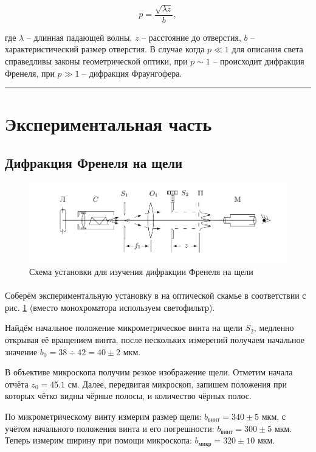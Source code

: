 \documentclass[a4paper,12pt]{article} %
\begin{document}
\[
p = \frac{\sqrt{\lambda z}}{b},
\]

\noindent где $\lambda$ -- длинная падающей волны, $z$ -- расстояние до отверстия, $b$ -- характеристический размер отверстия. В случае когда $p \ll 1$ для описания света справедливы законы геометрической оптики, при $p \sim 1$ -- происходит дифракция Френеля, при $p \gg 1$ --  дифракция Фраунгофера.


\medskip\hrule\medskip

\section{Экспериментальная часть}

\subsection{Дифракция Френеля на щели}

\begin{figure}[h]
\centering
\includegraphics[width=\textwidth]{setup1.png}
\caption{Схема установки для изучения дифракции Френеля на щели}
\label{fig:setup1}
\end{figure}

\paragraph{} Соберём экспериментальную установку в на оптической скамье в соответствии с рис. \ref{fig:setup1} (вместо монохроматора используем светофильтр). 

Найдём начальное положение микрометрическое винта на щели $S_2$, медленно открывая её вращением винта, после нескольких измерений получаем начальное значение $b_0 = 38 \div 42 = 40 \pm 2$ мкм.

В объективе микроскопа получим резкое изображение щели. Отметим начала отчёта $z_0 = 45.1$ см. Далее, передвигая микроскоп, запишем положения при которых чётко видны чёрные полосы, и количество чёрных полос.

По микрометрическому винту измерим размер щели: $b_\text{винт} = 340 \pm 5$ мкм, с учётом начального положения винта и его погрешности: $b_\text{винт} = 300 \pm 5$ мкм. Теперь измерим ширину при помощи микроскопа: $b_\text{микр} = 320 \pm 10$ мкм.
\end{document}
